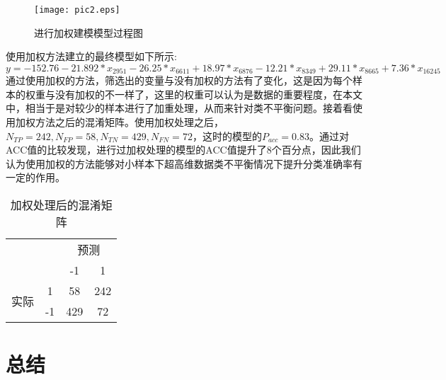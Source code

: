 \documentclass[
]{ctexart}
\begin{document}
\begin{figure}[h]  
\centering  
\texttt{[image: pic2.eps]}  
\caption{进行加权建模模型过程图}  
\label{建模过程图}  
\end{figure}

使用加权方法建立的最终模型如下所示: \[
y=-152.76-21.892*x_{2951}-26.25*x_{6611}+18.97*x_{6876}-12.21*x_{8349}+29.11*x_{8665}+7.36*x_{16245}
\]
通过使用加权的方法，筛选出的变量与没有加权的方法有了变化，这是因为每个样本的权重与没有加权的不一样了，这里的权重可以认为是数据的重要程度，在本文中，相当于是对较少的样本进行了加重处理，从而来针对类不平衡问题。接着看使用加权方法之后的混淆矩阵。使用加权处理之后，\(N_{TP}=242,N_{FP}=58,N_{TN}=429,N_{FN}=72\)，这时的模型的\(P_{a c c}=0.83\)。通过对ACC值的比较发现，进行过加权处理的模型的ACC值提升了8个百分点，因此我们认为使用加权的方法能够对小样本下超高维数据类不平衡情况下提升分类准确率有一定的作用。

\begin{table}[htbp]
  \centering
  \caption{加权处理后的混淆矩阵}
    \begin{tabular}{|c|c|c|c|}
    \toprule
    \multicolumn{2}{|c|}{\multirow{4}[4]{*}{\textcolor[rgb]{ .2,  .2,  .2}{}}} & \multicolumn{2}{c|}{\multirow{3}[2]{*}{\textcolor[rgb]{ .2,  .2,  .2}{预测}}} \\
    \multicolumn{2}{|c|}{} & \multicolumn{2}{c|}{} \\
    \multicolumn{2}{|c|}{} & \multicolumn{2}{c|}{} \\
\cmidrule{3-4}    \multicolumn{2}{|c|}{} & \textcolor[rgb]{ .2,  .2,  .2}{-1} & \textcolor[rgb]{ .2,  .2,  .2}{1} \\
    \midrule
    \multicolumn{1}{|c|}{\multirow{4}[4]{*}{\textcolor[rgb]{ .2,  .2,  .2}{实际}}} & \multirow{2}[2]{*}{\textcolor[rgb]{ .2,  .2,  .2}{1}} & \multirow{2}[2]{*}{\textcolor[rgb]{ .2,  .2,  .2}{58}} & \multirow{2}[2]{*}{\textcolor[rgb]{ .2,  .2,  .2}{242}} \\
          &       &       &  \\
\cmidrule{2-4}          & \multirow{2}[2]{*}{\textcolor[rgb]{ .2,  .2,  .2}{-1}} & \multirow{2}[2]{*}{\textcolor[rgb]{ .2,  .2,  .2}{429}} & \multirow{2}[2]{*}{\textcolor[rgb]{ .2,  .2,  .2}{72}} \\
          &       &       &  \\
    \bottomrule
    \end{tabular}%
  \label{tab:addlabel}%
\end{table}

\hypertarget{ux603bux7ed3-1}{%
\section{总结}\label{ux603bux7ed3-1}}
\end{document}
